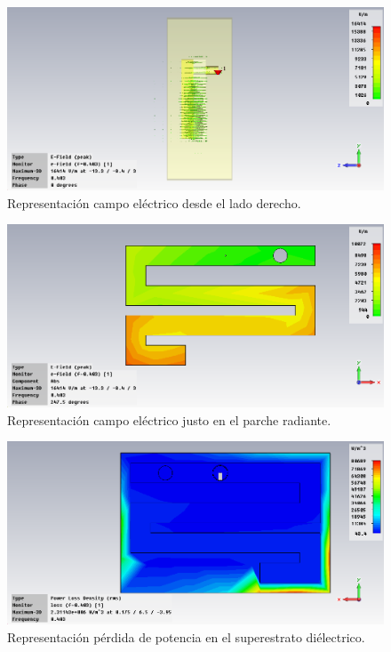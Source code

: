 \begin{figure}[!htb]
    \centering
    \includegraphics[scale=0.3]{./Simulaciones/original_antenna_muscle/original_serpentine_muscle_E-Field_3}
    \caption{Representación campo eléctrico desde el lado derecho.}
    \label{fig:fig5.13}
\end{figure}

\begin{figure}[!htb]
    \centering
    \includegraphics[scale=0.3]{./Simulaciones/original_antenna_muscle/original_serpentine_muscle_E-Field_4}
    \caption{Representación campo eléctrico justo en el parche radiante.}
    \label{fig:fig5.14}
\end{figure}

\begin{figure}[!htb]
    \centering
    \includegraphics[scale=0.4]{./Simulaciones/original_antenna_muscle/original_serpentine_muscle_power_loss}
    \caption{Representación pérdida de potencia en el superestrato diélectrico.}
    \label{fig:fig5.15}
\end{figure}

